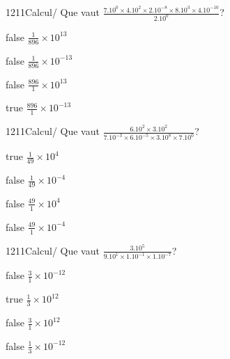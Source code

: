 \documentclass[11pt]{article}
\begin{document}
            \begin{question}{1211}{Calcul}{}{/}
                Que vaut $\frac{7.10^{0}\times 4.10^{2}\times 2.10^{-8}\times 8.10^{3}\times 4.10^{-10}}{2.10^{0}}$?
            \end{question}
            
            \begin{reponses}
                \item[false] $\frac{1}{896}\times 10^{13}$
                \item[false] $\frac{1}{896}\times 10^{-13}$
                \item[false] $\frac{896}{1}\times 10^{13}$
                \item[true] $\frac{896}{1}\times 10^{-13}$
            \end{reponses}
            
            \begin{question}{1211}{Calcul}{}{/}
                Que vaut $\frac{6.10^{2}\times 3.10^{2}}{7.10^{-3}\times 6.10^{-5}\times 3.10^{8}\times 7.10^{0}}$?
            \end{question}
            
            \begin{reponses}
                \item[true] $\frac{1}{49}\times 10^{4}$
                \item[false] $\frac{1}{49}\times 10^{-4}$
                \item[false] $\frac{49}{1}\times 10^{4}$
                \item[false] $\frac{49}{1}\times 10^{-4}$
            \end{reponses}
            
            \begin{question}{1211}{Calcul}{}{/}
                Que vaut $\frac{3.10^{5}}{9.10^{1}\times 1.10^{-1}\times 1.10^{-7}}$?
            \end{question}
            
            \begin{reponses}
                \item[false] $\frac{3}{1}\times 10^{-12}$
                \item[true] $\frac{1}{3}\times 10^{12}$
                \item[false] $\frac{3}{1}\times 10^{12}$
                \item[false] $\frac{1}{3}\times 10^{-12}$
            \end{reponses}
            
\end{document}
